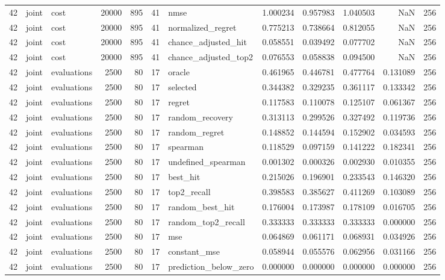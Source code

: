 \begin{tabular}{rllrrrlrrrrr}
42 & joint & cost & 20000 & 895 & 41 & nmse & 1.000234 & 0.957983 & 1.040503 & NaN & 256 \\
42 & joint & cost & 20000 & 895 & 41 & normalized_regret & 0.775213 & 0.738664 & 0.812055 & NaN & 256 \\
42 & joint & cost & 20000 & 895 & 41 & chance_adjusted_hit & 0.058551 & 0.039492 & 0.077702 & NaN & 256 \\
42 & joint & cost & 20000 & 895 & 41 & chance_adjusted_top2 & 0.076553 & 0.058838 & 0.094500 & NaN & 256 \\
42 & joint & evaluations & 2500 & 80 & 17 & oracle & 0.461965 & 0.446781 & 0.477764 & 0.131089 & 256 \\
42 & joint & evaluations & 2500 & 80 & 17 & selected & 0.344382 & 0.329235 & 0.361117 & 0.133342 & 256 \\
42 & joint & evaluations & 2500 & 80 & 17 & regret & 0.117583 & 0.110078 & 0.125107 & 0.061367 & 256 \\
42 & joint & evaluations & 2500 & 80 & 17 & random_recovery & 0.313113 & 0.299526 & 0.327492 & 0.119736 & 256 \\
42 & joint & evaluations & 2500 & 80 & 17 & random_regret & 0.148852 & 0.144594 & 0.152902 & 0.034593 & 256 \\
42 & joint & evaluations & 2500 & 80 & 17 & spearman & 0.118529 & 0.097159 & 0.141222 & 0.182341 & 256 \\
42 & joint & evaluations & 2500 & 80 & 17 & undefined_spearman & 0.001302 & 0.000326 & 0.002930 & 0.010355 & 256 \\
42 & joint & evaluations & 2500 & 80 & 17 & best_hit & 0.215026 & 0.196901 & 0.233543 & 0.146320 & 256 \\
42 & joint & evaluations & 2500 & 80 & 17 & top2_recall & 0.398583 & 0.385627 & 0.411269 & 0.103089 & 256 \\
42 & joint & evaluations & 2500 & 80 & 17 & random_best_hit & 0.176004 & 0.173987 & 0.178109 & 0.016705 & 256 \\
42 & joint & evaluations & 2500 & 80 & 17 & random_top2_recall & 0.333333 & 0.333333 & 0.333333 & 0.000000 & 256 \\
42 & joint & evaluations & 2500 & 80 & 17 & mse & 0.064869 & 0.061171 & 0.068931 & 0.034926 & 256 \\
42 & joint & evaluations & 2500 & 80 & 17 & constant_mse & 0.058944 & 0.055576 & 0.062956 & 0.031166 & 256 \\
42 & joint & evaluations & 2500 & 80 & 17 & prediction_below_zero & 0.000000 & 0.000000 & 0.000000 & 0.000000 & 256 \\

\end{tabular}

